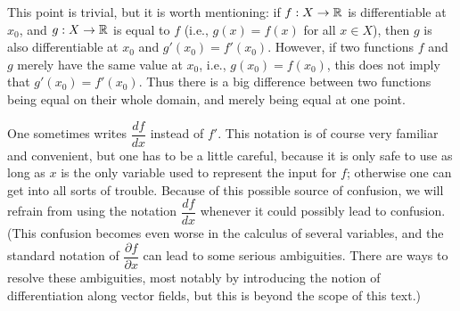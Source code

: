 \setcounter{thm}{3}
\begin{rmk}\label{i:10.1.4}
  This point is trivial, but it is worth mentioning:
  if \(f : X \to \mathbb{R}\) is differentiable at \(x_0\), and \(g : X \to \mathbb{R}\) is equal to \(f\) (i.e., \(g(x) = f(x)\) for all \(x \in X\)), then \(g\) is also differentiable at \(x_0\) and \(g'(x_0) = f'(x_0)\).
  However, if two functions \(f\) and \(g\) merely have the same value at \(x_0\), i.e., \(g(x_0) = f(x_0)\), this does not imply that \(g'(x_0) = f'(x_0)\).
  Thus there is a big difference between two functions being equal on their whole domain, and merely being equal at one point.
\end{rmk}

\begin{rmk}\label{i:10.1.5}
  One sometimes writes \(\dfrac{df}{dx}\) instead of \(f'\).
  This notation is of course very familiar and convenient, but one has to be a little careful, because it is only safe to use as long as \(x\) is the only variable used to represent the input for \(f\);
  otherwise one can get into all sorts of trouble.
  Because of this possible source of confusion, we will refrain from using the notation \(\dfrac{df}{dx}\) whenever it could possibly lead to confusion.
  (This confusion becomes even worse in the calculus of several variables, and the standard notation of \(\dfrac{\partial f}{\partial x}\) can lead to some serious ambiguities.
  There are ways to resolve these ambiguities, most notably by introducing the notion of differentiation along vector fields, but this is beyond the scope of this text.)
\end{rmk}

